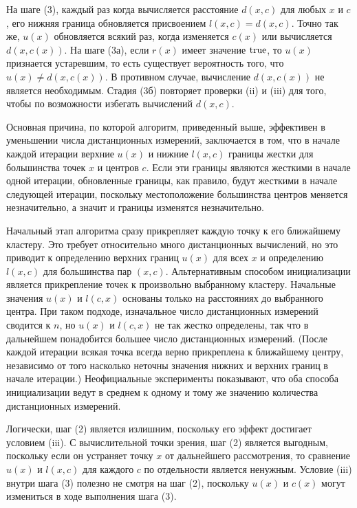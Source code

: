 На шаге (3), каждый раз когда вычисляется расстояние \( d(x, c) \) для любых \( x \) и \( c \), его нижняя граница обновляется присвоением \( l(x, c) = d(x, c) \). Точно так же, \( u(x) \) обновляется всякий раз, когда изменяется \( c(x) \) или вычисляется \( d(x, c(x)) \). На шаге (3а), если \( r(x) \) имеет значение \( \mathrm{true} \), то \( u(x) \) признается устаревшим, то есть существует вероятность того, что \( u(x) \ne d(x, c(x)) \). В противном случае, вычисление \( d(x, c(x)) \) не является необходимым. Стадия (3б) повторяет проверки (ii) и (iii) для того, чтобы по возможности избегать вычислений \( d(x, c) \).

Основная причина, по которой алгоритм, приведенный выше, эффективен в уменьшении числа дистанционных измерений, заключается в том, что в начале каждой итерации верхние \( u(x) \) и нижние \( l(x, c) \) границы жестки для большинства точек \( x \) и центров \( c \). Если эти границы являются жесткими в начале одной итерации, обновленные границы, как правило, будут жесткими в начале следующей итерации, поскольку местоположение большинства центров меняется незначительно, а значит и границы изменятся незначительно.

Начальный этап алгоритма сразу прикрепляет каждую точку к его ближайшему кластеру. Это требует относительно много дистанционных вычислений, но это приводит к определению верхних границ \( u(x) \) для всех \( x \) и определению \( l(x, c) \) для большинства пар \( (x, c) \). Альтернативным способом инициализации является прикрепление точек к произвольно выбранному кластеру. Начальные значения \( u(x) \) и \( l(c, x) \) основаны только на расстояниях до выбранного центра. При таком подходе, изначальное число дистанционных измерений сводится к \( n \), но \( u(x) \) и \( l(c, x) \) не так жестко определены, так что в дальнейшем понадобится большее число дистанционных измерений. (После каждой итерации всякая точка всегда верно прикреплена к ближайшему центру, независимо от того насколько неточны значения нижних и верхних границ в начале итерации.) Неофициальные эксперименты показывают, что оба способа инициализации ведут в среднем к одному и тому же значению количества дистанционных измерений.

Логически, шаг (2) является излишним, поскольку его эффект достигает условием (iii). С вычислительной точки зрения, шаг (2) является выгодным, поскольку если он устраняет точку \( x \) от дальнейшего рассмотрения, то сравнение \( u(x) \) и \( l(x, c) \) для каждого \( c \) по отдельности является ненужным. Условие (iii) внутри шага (3) полезно не смотря на шаг (2), поскольку \( u(x) \) и \( c(x) \) могут измениться в ходе выполнения шага (3).

